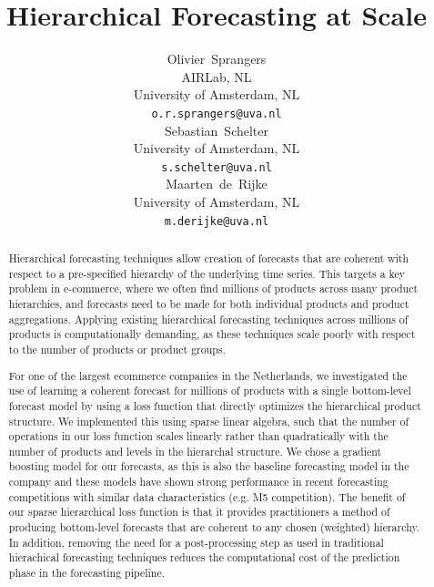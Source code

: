 \documentclass{article}
\title{Hierarchical Forecasting at Scale}
\author{%
  Olivier~Sprangers \\
  AIRLab, NL \\
  University of Amsterdam, NL\\
  \texttt{o.r.sprangers@uva.nl} \\
  \And
  Sebastian~Schelter \\
  University of Amsterdam, NL \\
  \texttt{s.schelter@uva.nl} \\
  \And
  Maarten~de~Rijke \\
  University of Amsterdam, NL \\
  \texttt{m.derijke@uva.nl} \\
}
\begin{document}
\maketitle

\begin{abstract}
  


  Hierarchical forecasting techniques allow creation of forecasts that are coherent with respect to a pre-specified hierarchy of the underlying time series. This targets a key problem in e-commerce, where we often find millions of products across many product hierarchies, and forecasts need to be made for both individual products and product aggregations. Applying existing hierarchical forecasting techniques across millions of products is computationally demanding, as these techniques scale poorly with respect to the number of products or product groups.
  
  For one of the largest ecommerce companies in the Netherlands, we investigated the use of learning a coherent forecast for millions of products with a single bottom-level forecast model by using a loss function that directly optimizes the hierarchical product structure. We implemented this using sparse linear algebra, such that the number of operations in our loss function scales linearly rather than quadratically with the number of products and levels in the hierarchal structure. We chose a gradient boosting model for our forecasts, as this is also the baseline forecasting model in the company and these models have shown strong performance in recent forecasting competitions with similar data characteristics (e.g. M5 competition). The benefit of our sparse hierarchical loss function is that it provides practitioners a method of producing bottom-level forecasts that are coherent to any chosen (weighted) hierarchy. In addition, removing the need for a post-processing step as used in traditional hierachical forecasting techniques reduces the computational cost of the prediction phase in the forecasting pipeline. 


\end{abstract}
\end{document}
